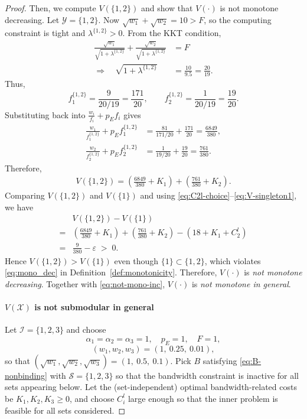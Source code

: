 \documentclass[lettersize,journal]{IEEEtran}
\begin{document}
\begin{proof}
Then, we compute $V(\{1,2\})$ and show that $V(\cdot)$ is not monotone decreasing.
Let $\mathcal{Y}=\{1,2\}$. Now $\sqrt{w_1}+\sqrt{w_2}=10>F$, so the computing constraint is tight and $\lambda^{\{1,2\}}>0$.
From the KKT condition,
\begin{align}
\frac{\sqrt{w_1}}{\sqrt{1+\lambda^{\{1,2\}}}}
+
\frac{\sqrt{w_2}}{\sqrt{1+\lambda^{\{1,2\}}}}
&=F
\nonumber\\
\Longrightarrow\quad
\sqrt{1+\lambda^{\{1,2\}}}
&=
\frac{10}{9.5}
=
\frac{20}{19}.
\label{eq:lambda-12}
\end{align}
Thus,
\[
f^{\{1,2\}}_1=\frac{9}{20/19}=\frac{171}{20},
\qquad
f^{\{1,2\}}_2=\frac{1}{20/19}=\frac{19}{20}.
\]
Substituting back into $\frac{w_i}{f_i}+p_E f_i$ gives
\begin{align}
\frac{w_1}{f^{\{1,2\}}_1}+p_E f^{\{1,2\}}_1
&=
\frac{81}{171/20}+\frac{171}{20}
=
\frac{6849}{380},
\nonumber\\
\frac{w_2}{f^{\{1,2\}}_2}+p_E f^{\{1,2\}}_2
&=
\frac{1}{19/20}+\frac{19}{20}
=
\frac{761}{380}.
\label{eq:cost-12}
\end{align}
Therefore,
\begin{align}
V(\{1,2\})
=
\left(\frac{6849}{380}+K_1\right)
+
\left(\frac{761}{380}+K_2\right).
\label{eq:V-12}
\end{align}
Comparing $V(\{1,2\})$ and $V(\{1\})$ and using \eqref{eq:C2l-choice}--\eqref{eq:V-singleton1}, we have
\begin{align}
&V(\{1,2\})-V(\{1\})\nonumber\\
=&
\left(\frac{6849}{380}+K_1\right)
+
\left(\frac{761}{380}+K_2\right)
-
\left(18+K_1+C_2^{l}\right)
\nonumber\\
=&
\frac{9}{380}-\varepsilon
\;>\;0.
\label{eq:not-mono-dec}
\end{align}
Hence $V(\{1,2\})>V(\{1\})$ even though $\{1\}\subset\{1,2\}$, which violates \eqref{eq:mono_dec} in Definition~\ref{def:monotonicity}. Therefore, $V(\cdot)$ is \emph{not monotone decreasing}. Together with \eqref{eq:not-mono-inc}, $V(\cdot)$ is \emph{not monotone in general}.

\paragraph{$V(\mathcal{X})$ is not submodular in general}
Let $\mathcal{I}=\{1,2,3\}$ and choose
\[
\alpha_1=\alpha_2=\alpha_3=1,\quad p_E=1,\quad F=1,\]
\[
(w_1,w_2,w_3)=(1,\ 0.25,\ 0.01),
\]
so that $(\sqrt{w_1},\sqrt{w_2},\sqrt{w_3})=(1,\ 0.5,\ 0.1)$.
Pick $B$ satisfying \eqref{eq:B-nonbinding} with $\mathcal{S}=\{1,2,3\}$ so that the bandwidth constraint is inactive for all sets appearing below.
Let the (set-independent) optimal bandwidth-related costs be $K_1,K_2,K_3\ge 0$, and choose $C_i^l$ large enough so that the inner problem is feasible for all sets considered.


\end{proof}
\end{document}
